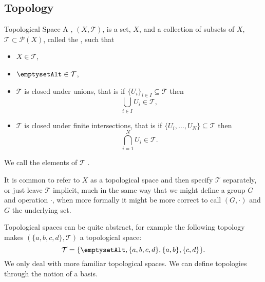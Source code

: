 \subsection{Topology}
\begin{dfn}{Topological Space}{}
    A , \((X, \mathcal{T})\), is a set, \(X\), and a collection of subsets of \(X\), \(\mathcal{T} \subset \mathcal{P}(X)\), called the , such that
    \begin{itemize}
        \item \(X \in \mathcal{T}\),
        \item \(\emptysetAlt \in \mathcal{T}\),
        \item \(\mathcal{T}\) is closed under unions, that is if \(\{U_i\}_{i \in I} \subseteq \mathcal{T}\) then\vspace{-1ex}
        \begin{equation}
            \bigcup_{i\in I} U_i \in \mathcal{T},
        \end{equation}\vspace{-4ex}
        \item \(\mathcal{T}\) is closed under finite intersections, that is if \(\{U_i, \dotsc, U_N\} \subseteq \mathcal{T}\) then\vspace{-4ex}
        \begin{equation}
            \bigcap_{i = 1}^{N} U_i \in \mathcal{T}.
        \end{equation}
    \end{itemize}\vspace{-1ex}
    We call the elements of \(\mathcal{T}\) .
\end{dfn}

It is common to refer to \(X\) as a topological space and then specify \(\mathcal{T}\) separately, or just leave \(\mathcal{T}\) implicit, much in the same way that we might define a group \(G\) and operation \(\cdot\), when more formally it might be more correct to call \((G, \cdot)\) and \(G\) the underlying set.

Topological spaces can be quite abstract, for example the following topology makes \((\{a, b, c, d\}, \mathcal{T})\) a topological space:
\begin{equation}
    \mathcal{T} = \{\emptysetAlt, \{a, b, c, d\}, \{a, b\}, \{c, d\}\}.
\end{equation}
We only deal with more familiar topological spaces.
We can define topologies through the notion of a basis.

